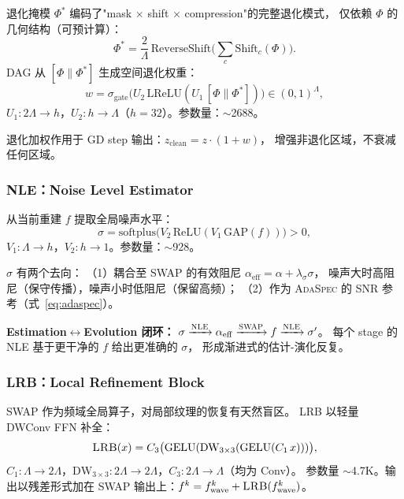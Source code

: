 \documentclass[a4paper,11pt,twocolumn]{ctexart}
\newcommand{\swap}{\textsc{SWAP}}
\newcommand{\adaspec}{\textsc{AdaSpec}}
\newcommand{\dag}{\textsc{DAG}}
\newcommand{\nle}{\textsc{NLE}}
\newcommand{\lrb}{\textsc{LRB}}
\newcommand{\alphaEff}{\alpha_{\mathrm{eff}}}
\begin{document}
退化掩模 $\Phi^*$ 编码了"mask $\times$ shift $\times$ compression"的完整退化模式，
仅依赖 $\Phi$ 的几何结构（可预计算）：
\begin{equation}
\Phi^* = \frac{2}{\Lambda}\,\text{ReverseShift}\Big(\sum_{c} \text{Shift}_c(\Phi)\Big).
\label{eq:phi_star}
\end{equation}
\dag{} 从 $[\Phi \| \Phi^*]$ 生成空间退化权重：
\begin{equation}
w = \sigma_{\mathrm{gate}}\big(U_2\,\text{LReLU}(U_1\,[\Phi \| \Phi^*])\big) \in (0, 1)^\Lambda,
\label{eq:dag}
\end{equation}
$U_1: 2\Lambda \to h$，$U_2: h \to \Lambda$（$h=32$）。参数量：$\sim$2688。

退化加权作用于 GD step 输出：$z_{\mathrm{clean}} = z \cdot (1 + w)$，
增强非退化区域，不衰减任何区域。

\subsubsection{\nle{}：Noise Level Estimator}

从当前重建 $f$ 提取全局噪声水平：
\begin{equation}
\sigma = \mathrm{softplus}\big(V_2\,\text{ReLU}(V_1\,\text{GAP}(f))\big) > 0,
\label{eq:nle}
\end{equation}
$V_1: \Lambda \to h$，$V_2: h \to 1$。参数量：$\sim$928。

$\sigma$ 有两个去向：
（1）耦合至 \swap{} 的有效阻尼 $\alphaEff = \alpha + \lambda_\sigma \sigma$，
噪声大时高阻尼（保守传播），噪声小时低阻尼（保留高频）；
（2）作为 \adaspec{} 的 SNR 参考（式~\ref{eq:adaspec}）。

\textbf{Estimation$\leftrightarrow$Evolution 闭环：}
$\sigma \xrightarrow{\nle{}} \alphaEff \xrightarrow{\swap{}} f \xrightarrow{\nle{}} \sigma'$。
每个 stage 的 \nle{} 基于更干净的 $f$ 给出更准确的 $\sigma$，
形成渐进式的估计-演化反复。


\subsubsection{\lrb{}：Local Refinement Block}

\swap{} 作为频域全局算子，对局部纹理的恢复有天然盲区。
\lrb{} 以轻量 DWConv FFN 补全：
\begin{equation}
\lrb{}(x) = C_3\big(\text{GELU}(\text{DW}_{3 \times 3}(\text{GELU}(C_1\,x)))\big),
\label{eq:lrb}
\end{equation}
$C_1: \Lambda \to 2\Lambda$，$\text{DW}_{3\times3}: 2\Lambda \to 2\Lambda$，$C_3: 2\Lambda \to \Lambda$（均为 Conv）。
参数量 $\sim$4.7K。输出以残差形式加在 \swap{} 输出上：$f^k = f^k_{\mathrm{wave}} + \lrb{}(f^k_{\mathrm{wave}})$。
\end{document}
